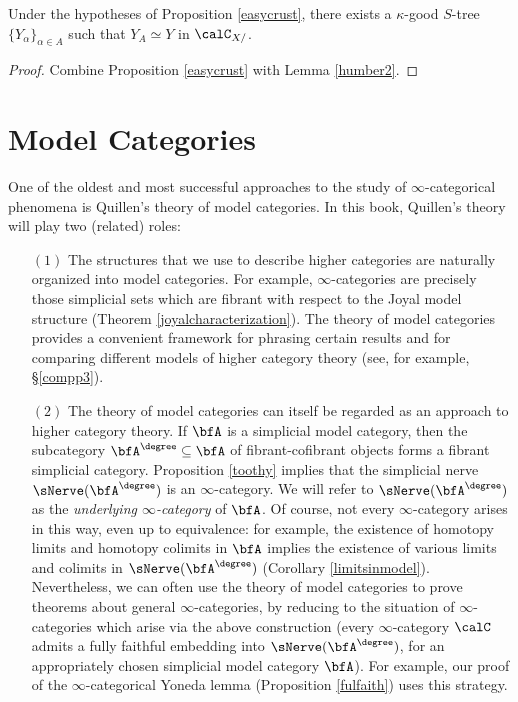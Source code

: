 \begin{corollary}\label{unitape}
Under the hypotheses of Proposition \ref{easycrust}, there exists a $\kappa$-good
$S$-tree $\{ Y_{\alpha} \}_{\alpha \in A}$ such that $Y_{A} \simeq Y$ in $\calC_{X/}$.
\end{corollary}

\begin{proof}
Combine Proposition \ref{easycrust} with Lemma \ref{humber2}.
\end{proof}


\section{Model Categories}\label{appmodelcat}

One of the oldest and most successful approaches to the study of
$\infty$-categorical phenomena is Quillen's theory of model
categories. In this book, Quillen's theory will play two (related) roles:

\begin{itemize}
\item[$(1)$] The structures that we use to describe higher categories are naturally organized into model categories. For example, $\infty$-categories are precisely those simplicial sets which are fibrant with respect to the Joyal model structure (Theorem \ref{joyalcharacterization}).
The theory of model categories provides a convenient framework for phrasing certain results and for comparing different models of higher category theory (see, for example, \S \ref{compp3}).

\item[$(2)$] The theory of model categories can itself be regarded as an approach to higher
category theory. If $\bfA$ is a simplicial model category, then the subcategory $\bfA^{\degree} \subseteq \bfA$ of fibrant-cofibrant objects forms a fibrant simplicial category. Proposition \ref{toothy} implies that the simplicial nerve $\sNerve(\bfA^{\degree})$ is an $\infty$-category. We will refer to $\sNerve(\bfA^{\degree})$ as the {\it underlying $\infty$-category} of
$\bfA$. Of course, not every $\infty$-category arises in this way, even up to equivalence: for example, the existence of homotopy limits and homotopy colimits in $\bfA$ implies the existence of various limits and colimits in $\sNerve(\bfA^{\degree})$ (Corollary \ref{limitsinmodel}). Nevertheless, we can often use the theory of model categories to prove theorems about general $\infty$-categories, by reducing to the situation of $\infty$-categories which arise via the above construction (every
$\infty$-category $\calC$ admits a fully faithful embedding into $\sNerve( \bfA^{\degree})$, for
an appropriately chosen simplicial model category $\bfA$). For example, our proof of the $\infty$-categorical Yoneda lemma (Proposition \ref{fulfaith}) uses this strategy.
\end{itemize}

